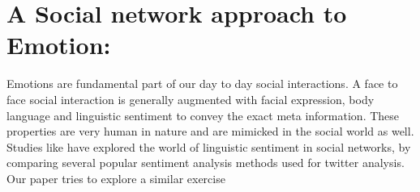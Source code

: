 \section{ A Social network approach to Emotion: }
Emotions are fundamental part of our day to day social interactions. A face to face social interaction is generally augmented with facial expression, body language and linguistic sentiment to convey the exact meta information. These properties are very human in nature and are mimicked in the social world as well. Studies like \cite{Joo2014b} have explored the world of linguistic sentiment in social networks, by comparing several popular sentiment analysis methods used for twitter analysis. Our paper tries to explore a similar exercise 
